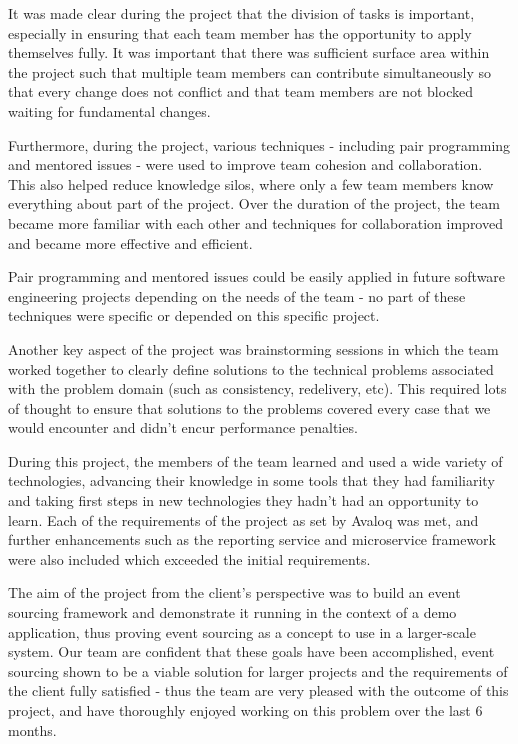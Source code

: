 \documentclass{l3proj}
\begin{document}
It was made clear during the project that the division of tasks is important, especially in ensuring that each team member has the opportunity to apply themselves fully. It was important that there was sufficient surface area within the project such that multiple team members can contribute simultaneously so that every change does not conflict and that team members are not blocked waiting for fundamental changes.

Furthermore, during the project, various techniques - including pair programming and mentored issues - were used to improve team cohesion and collaboration. This also helped reduce knowledge silos, where only a few team members know everything about part of the project. Over the duration of the project, the team became more familiar with each other and techniques for collaboration improved and became more effective and efficient.

Pair programming and mentored issues could be easily applied in future software engineering projects depending on the needs of the team - no part of these techniques were specific or depended on this specific project.

Another key aspect of the project was brainstorming sessions in which the team worked together to clearly define solutions to the technical problems associated with the problem domain (such as consistency, redelivery, etc). This required lots of thought to ensure that solutions to the problems covered every case that we would encounter and didn't encur performance penalties.

During this project, the members of the team learned and used a wide variety of technologies, advancing their knowledge in some tools that they had familiarity and taking first steps in new technologies they hadn't had an opportunity to learn. Each of the requirements of the project as set by Avaloq was met, and further enhancements such as the reporting service and microservice framework were also included which exceeded the initial requirements.

The aim of the project from the client's perspective was to build an event sourcing framework and demonstrate it running in the context of a demo application, thus proving event sourcing as a concept to use in a larger-scale system. Our team are confident that these goals have been accomplished, event sourcing shown to be a viable solution for larger projects and the requirements of the client fully satisfied - thus the team are very pleased with the outcome of this project, and have thoroughly enjoyed working on this problem over the last 6 months.



\end{document}
